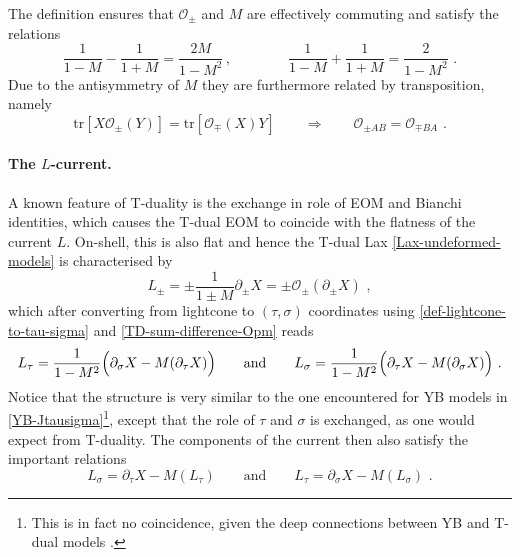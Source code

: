 \documentclass[12pt]{article}
\numberwithin{equation}{section}
\begin{document}
The definition ensures that $\mathcal{O}_{\pm}$ and $M$ are effectively commuting and satisfy the relations
\begin{equation}\label{TD-sum-difference-Opm}
\frac{1}{1-M}-\frac{1}{1+M}=\frac{2M}{1-M^2} \, , 
\qquad 
\qquad 
\frac{1}{1-M}+\frac{1}{1+M}=\frac{2}{1-M^2} \,\, .
\end{equation}
Due to the antisymmetry of $M$ they are furthermore related by transposition, namely
\begin{equation}
\mathrm{tr}[X\mathcal{O}_{\pm}(Y)]=\mathrm{tr}[\mathcal{O}_{\mp}(X)Y] 
\qquad \Longrightarrow \qquad
\mathcal{O}_{\pm AB}=\mathcal{O}_{\mp BA} \,\, .
\end{equation}

\paragraph{The $L$-current.} A known feature of T-duality is the exchange in role of EOM and Bianchi identities, which causes the T-dual EOM to coincide with the flatness of the current $L$. On-shell, this is also flat and hence the T-dual Lax \eqref{Lax-undeformed-models} is characterised by
\begin{equation}
L_{\pm}=\pm\frac{1}{1\pm M} \partial_{\pm}X = \pm \mathcal{O}_{\pm}(\partial_{\pm} X) \,\, ,
\end{equation}
which after converting from lightcone to $(\tau,\sigma)$ coordinates using \eqref{def-lightcone-to-tau-sigma} and \eqref{TD-sum-difference-Opm} reads
\begin{equation}\label{TD-jtilde-tau-sigma-coordinates}
L_{\tau}=\frac{1}{1-M^2}\Bigl( \partial_{\sigma}X - M(\partial_{\tau}X) \Bigr)
\qquad \text{and} \qquad
L_{\sigma}=\frac{1}{1-M^2}\Bigl( \partial_{\tau}X - M(\partial_{\sigma}X) \Bigr) \,\, .
\end{equation}
Notice that the structure is very similar to the one encountered for YB models in \eqref{YB-Jtausigma}\footnote{This is in fact no coincidence, given the deep connections between YB and T-dual models \cite{Osten:2016dvf,Borsato:2016pas,Borsato:2017qsx,Borsato:2018idb}.}, except that the role of $\tau$ and $\sigma$ is exchanged, as one would expect from T-duality. 
The components of the current then also satisfy the important relations
\begin{equation}\label{TD-tildejtau-tildejsigma-relation}
L_{\sigma}=\partial_{\tau}X-M(L_{\tau})
\qquad \text{and} \qquad
L_{\tau}=\partial_{\sigma}X-M(L_{\sigma}) \,\, .
\end{equation}
\end{document}
